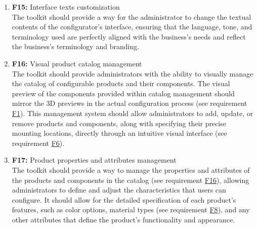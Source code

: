 \begin{enumerate}
\item \textbf{F15:} \label{itm:F15} Interface texts customization
\vspace{2pt}
\\The toolkit should provide a way for the administrator to change the textual contents of the configurator's interface, ensuring that the language, tone, and terminology used are perfectly aligned with the business's needs and reflect the business's terminology and branding.
\vspace{4pt}

\item \textbf{F16:} \label{itm:F16} Visual product catalog management
\vspace{2pt}
\\The toolkit should provide administrators with the ability to visually manage the catalog of configurable products and their components. The visual preview of the components provided within catalog management should mirror the 3D previews in the actual configuration process (see requirement \hyperref[itm:F1]{F1}). This management system should allow administrators to add, update, or remove products and components, along with specifying their precise mounting locations, directly through an intuitive visual interface (see requirement \hyperref[itm:F6]{F6}).
\vspace{4pt}

\item \textbf{F17:} Product properties and attributes management
\vspace{2pt}
\\The toolkit should provide a way to manage the properties and attributes of the products and components in the catalog (see requirement \hyperref[itm:F16]{F16}), allowing administrators to define and adjust the characteristics that users can configure. It should allow for the detailed specification of each product's features, such as color options, material types (see requirement \hyperref[itm:F8]{F8}), and any other attributes that define the product's functionality and appearance.
\vspace{4pt}



\end{enumerate}
